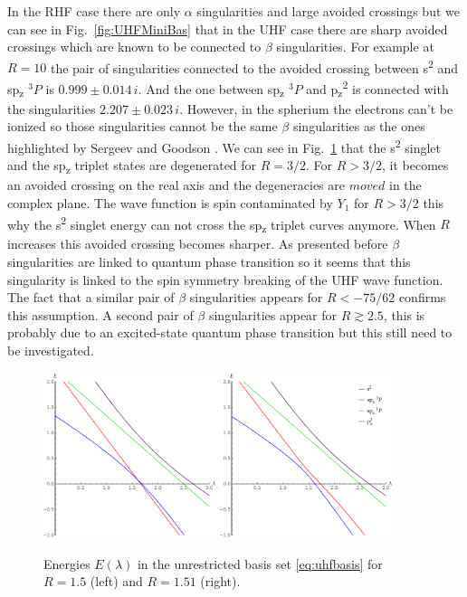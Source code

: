 \documentclass[11pt,a4paper]{article}
\begin{document}
In the RHF case there are only $\alpha$ singularities and large avoided crossings but we can see in Fig.~\ref{fig:UHFMiniBas} that in the UHF case there are sharp avoided crossings which are known to be connected to $\beta$ singularities. For example at $R=10$ the pair of singularities connected to the avoided crossing between s\textsuperscript{2} and sp\textsubscript{z} $^{3}P$ is $0.999\pm0.014\,i$. And the one between sp\textsubscript{z} $^{3}P$ and p\textsubscript{z}\textsuperscript{2} is connected with the singularities $2.207\pm0.023\,i$. However, in the spherium the electrons can't be ionized so those singularities cannot be the same $\beta$ singularities as the ones highlighted by Sergeev and Goodson \cite{Sergeev_2005}. We can see in Fig.~\ref{fig:UHFEP} that the s\textsuperscript{2} singlet and the sp\textsubscript{z} triplet states are degenerated for $R=3/2$. For $R>3/2$, it becomes an avoided crossing on the real axis and the degeneracies are $moved$ in the complex plane. The wave function is spin contaminated by $Y_1$ for $R>3/2$ this why the s\textsuperscript{2} singlet energy can not cross the sp\textsubscript{z} triplet curves anymore. When $R$ increases this avoided crossing becomes sharper. As presented before $\beta$ singularities are linked to quantum phase transition so it seems that this singularity is linked to the spin symmetry breaking of the UHF wave function. The fact that a similar pair of $\beta$ singularities appears for $R<-75/62$ confirms this assumption. A second pair of $\beta$ singularities appear for $R\gtrsim 2.5$, this is probably due to an excited-state quantum phase transition but this still need to be investigated. 

\begin{figure}
    \centering
    \includegraphics[width=0.45\textwidth]{UHFCI.pdf}
    \includegraphics[width=0.45\textwidth]{UHFEP.pdf}
    \caption{Energies $E(\lambda)$ in the unrestricted basis set \eqref{eq:uhfbasis} for $R=1.5$ (left) and $R=1.51$ (right).}
    \label{fig:UHFEP}
\end{figure}
\end{document}
